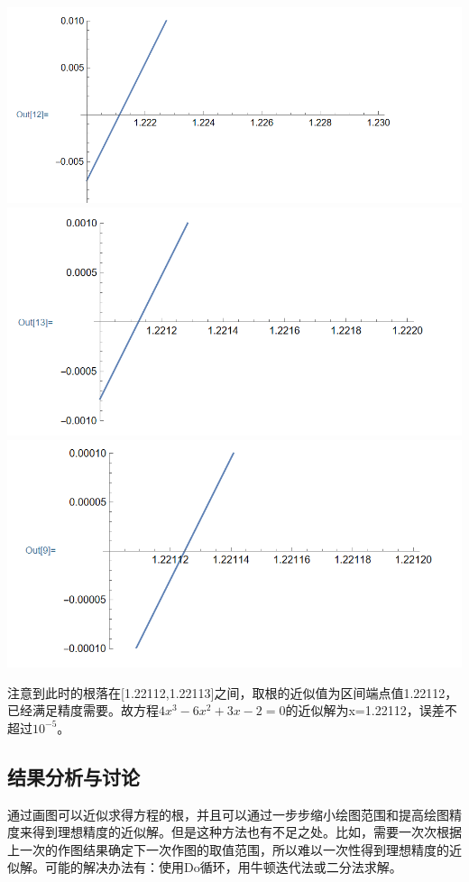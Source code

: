 \documentclass{ctexart}
\begin{document}
\begin{center}
\includegraphics[scale=0.5]{3.png}\\
\includegraphics[scale=0.5]{4.png}\\
\includegraphics[scale=0.5]{5.png}\\
\end{center}

注意到此时的根落在[1.22112,1.22113]之间，取根的近似值为区间端点值1.22112，已经满足精度需要。故方程$4x^3-6x^2+3x-2=0$的近似解为x=1.22112，误差不超过$10^{-5}$。
\subsection{结果分析与讨论}
通过画图可以近似求得方程的根，并且可以通过一步步缩小绘图范围和提高绘图精度来得到理想精度的近似解。但是这种方法也有不足之处。比如，需要一次次根据上一次的作图结果确定下一次作图的取值范围，所以难以一次性得到理想精度的近似解。可能的解决办法有：使用Do循环，用牛顿迭代法或二分法求解。
\end{document}
